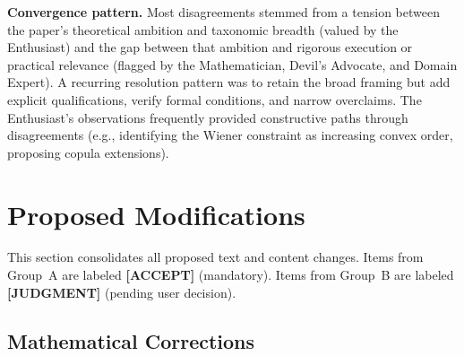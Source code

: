 \documentclass[11pt,a4paper]{article}
\newcommand{\acceptlabel}{\textbf{\textcolor{acceptgreen}{[ACCEPT]}}}
\newcommand{\judgmentlabel}{\textbf{\textcolor{judgmentorange}{[JUDGMENT]}}}
\begin{document}
\textbf{Convergence pattern.} Most disagreements stemmed from a tension between the paper's theoretical ambition and taxonomic breadth (valued by the Enthusiast) and the gap between that ambition and rigorous execution or practical relevance (flagged by the Mathematician, Devil's Advocate, and Domain Expert). A recurring resolution pattern was to retain the broad framing but add explicit qualifications, verify formal conditions, and narrow overclaims. The Enthusiast's observations frequently provided constructive paths through disagreements (e.g., identifying the Wiener constraint as increasing convex order, proposing copula extensions).

\newpage
\section{Proposed Modifications}

This section consolidates all proposed text and content changes. Items from Group~A are labeled \acceptlabel{} (mandatory). Items from Group~B are labeled \judgmentlabel{} (pending user decision).

\subsection{Mathematical Corrections}
\end{document}
